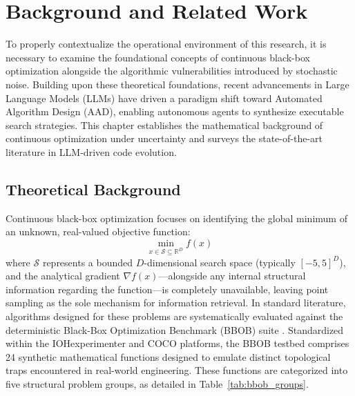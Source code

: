 
\chapter{Background and Related Work}\label{chap:research}

To properly contextualize the operational environment of this research, it is necessary to examine the foundational concepts of continuous black-box optimization alongside the algorithmic vulnerabilities introduced by stochastic noise. Building upon these theoretical foundations, recent advancements in Large Language Models (LLMs) have driven a paradigm shift toward Automated Algorithm Design (AAD), enabling autonomous agents to synthesize executable search strategies. This chapter establishes the mathematical background of continuous optimization under uncertainty and surveys the state-of-the-art literature in LLM-driven code evolution.

\section{Theoretical Background}\label{sec:bg_theory}

Continuous black-box optimization focuses on identifying the global minimum of an unknown, real-valued objective function:
\begin{equation}\label{eq:bbob_min}
    \min_{x \in \mathcal{S} \subseteq \mathbb{R}^D} f(x)
\end{equation}
where $\mathcal{S}$ represents a bounded $D$-dimensional search space (typically $[-5, 5]^D$), and the analytical gradient $\nabla f(x)$—alongside any internal structural information regarding the function—is completely unavailable, leaving point sampling as the sole mechanism for information retrieval. In standard literature, algorithms designed for these problems are systematically evaluated against the deterministic Black-Box Optimization Benchmark (BBOB) suite \cite{Hansen2010}. Standardized within the IOHexperimenter and COCO platforms, the BBOB testbed comprises 24 synthetic mathematical functions designed to emulate distinct topological traps encountered in real-world engineering. These functions are categorized into five structural problem groups, as detailed in Table~\ref{tab:bbob_groups}.

